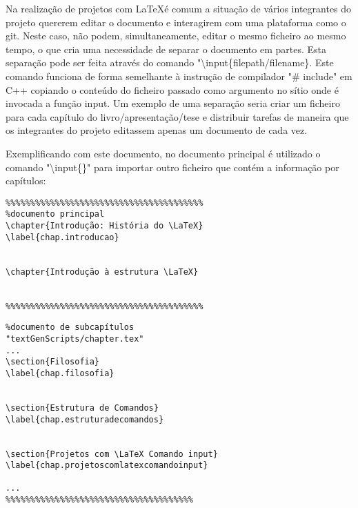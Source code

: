 Na realização de projetos com \LaTeX é comum a situação de vários integrantes do projeto quererem editar o documento e interagirem com uma plataforma como o git. Neste caso, não podem, simultaneamente, editar o mesmo ficheiro ao mesmo tempo, o que cria uma necessidade de separar o documento em partes. Esta separação pode ser feita através do comando "\textbackslash input\{filepath/filename\}. Este comando funciona de forma semelhante à instrução de compilador "\# include" em C++ copiando o conteúdo do ficheiro passado como argumento no sítio onde é invocada a função input. Um exemplo de uma separação seria criar um ficheiro para cada capítulo do livro/apresentação/tese e distribuir tarefas de maneira que os integrantes do projeto editassem apenas um documento de cada vez.

Exemplificando com este documento, no documento principal é utilizado o comando "\textbackslash input\{\}" para importar outro ficheiro que contém a informação por capítulos:

\begin{verbatim}
%%%%%%%%%%%%%%%%%%%%%%%%%%%%%%%%%%%%%%%%
%documento principal
\chapter{Introdução: História do \LaTeX}
\label{chap.introducao}


\chapter{Introdução à estrutura \LaTeX}


%%%%%%%%%%%%%%%%%%%%%%%%%%%%%%%%%%%%%%%%
\end{verbatim}


\begin{verbatim}
%documento de subcapítulos
"textGenScripts/chapter.tex"
...
\section{Filosofia}
\label{chap.filosofia}


\section{Estrutura de Comandos}
\label{chap.estruturadecomandos}


\section{Projetos com \LaTeX Comando input}
\label{chap.projetoscomlatexcomandoinput}

...
%%%%%%%%%%%%%%%%%%%%%%%%%%%%%%%%%%%%%%
\end{verbatim}

